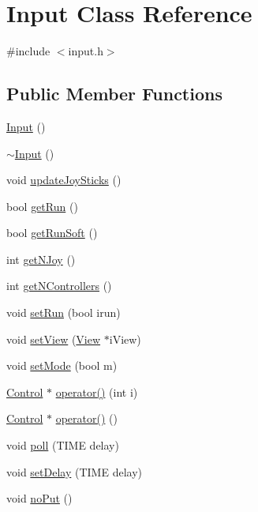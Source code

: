 \hypertarget{class_input}{\section{Input Class Reference}
\label{class_input}
}


{\ttfamily \#include $<$input.\-h$>$}

\subsection*{Public Member Functions}
\begin{DoxyCompactItemize}
\item 
\hyperlink{class_input_abae3f379d3f157cf42dc857309832dba}{Input} ()
\item 
\hyperlink{class_input_af2db35ba67c8a8ccd23bef6a482fc291}{$\sim$\-Input} ()
\item 
void \hyperlink{class_input_ad9217898fc129b639f659dfcf2051422}{update\-Joy\-Sticks} ()
\item 
bool \hyperlink{class_input_a92d0be97aef7c8a85e3ac079a953ddf5}{get\-Run} ()
\item 
bool \hyperlink{class_input_adf4c5d205abace51a84e0f22a01c5d1e}{get\-Run\-Soft} ()
\item 
int \hyperlink{class_input_a95d0ed505dd98df8e249cee84d42698e}{get\-N\-Joy} ()
\item 
int \hyperlink{class_input_a92810f124cfa07732cd4089db5223cf1}{get\-N\-Controllers} ()
\item 
void \hyperlink{class_input_a191467f0069994daa70d9e954cfcd057}{set\-Run} (bool irun)
\item 
void \hyperlink{class_input_afc125d0c884799e9f21c46aa87d1b43c}{set\-View} (\hyperlink{class_view}{View} $\ast$i\-View)
\item 
void \hyperlink{class_input_a0c58e9cd087973bfb6cb02e4856fb2b3}{set\-Mode} (bool m)
\item 
\hyperlink{class_control}{Control} $\ast$ \hyperlink{class_input_a2d4d3d1adde7fb767eb8f37f3d72f5da}{operator()} (int i)
\item 
\hyperlink{class_control}{Control} $\ast$ \hyperlink{class_input_acf1652c44b902096beddf17c286dd38b}{operator()} ()
\item 
void \hyperlink{class_input_acf9bd6cc4f3e108c71595dd016cf58f9}{poll} (T\-I\-M\-E delay)
\item 
void \hyperlink{class_input_a2f1652eeac94560e6f08bad11cff6ace}{set\-Delay} (T\-I\-M\-E delay)
\item 
void \hyperlink{class_input_a0882492ac62c79e87e38beb5b95fcfa6}{no\-Put} ()
\end{DoxyCompactItemize}


